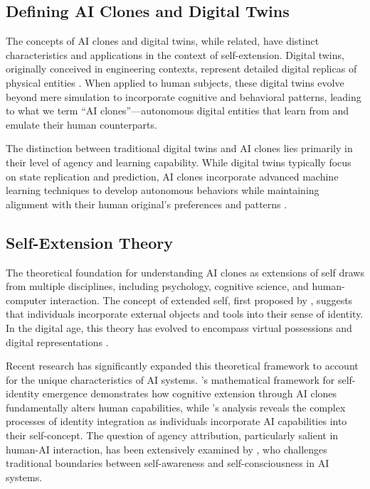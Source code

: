 \subsection{Defining AI Clones and Digital Twins}

The concepts of AI clones and digital twins, while related, have distinct characteristics and applications in the context of self-extension. Digital twins, originally conceived in engineering contexts, represent detailed digital replicas of physical entities \citep{smith2022digital}. When applied to human subjects, these digital twins evolve beyond mere simulation to incorporate cognitive and behavioral patterns, leading to what we term ``AI clones''---autonomous digital entities that learn from and emulate their human counterparts.

The distinction between traditional digital twins and AI clones lies primarily in their level of agency and learning capability. While digital twins typically focus on state replication and prediction, AI clones incorporate advanced machine learning techniques to develop autonomous behaviors while maintaining alignment with their human original's preferences and patterns \citep{lauer2024digital}.

\subsection{Self-Extension Theory}

The theoretical foundation for understanding AI clones as extensions of self draws from multiple disciplines, including psychology, cognitive science, and human-computer interaction. The concept of extended self, first proposed by \citet{belk1988possessions}, suggests that individuals incorporate external objects and tools into their sense of identity. In the digital age, this theory has evolved to encompass virtual possessions and digital representations \citep{kawakami2020digital}.

Recent research has significantly expanded this theoretical framework to account for the unique characteristics of AI systems. \citet{lee2024self}'s mathematical framework for self-identity emergence demonstrates how cognitive extension through AI clones fundamentally alters human capabilities, while \citet{veliev2024digital}'s analysis reveals the complex processes of identity integration as individuals incorporate AI capabilities into their self-concept. The question of agency attribution, particularly salient in human-AI interaction, has been extensively examined by \citet{namestiuk2023self}, who challenges traditional boundaries between self-awareness and self-consciousness in AI systems.

